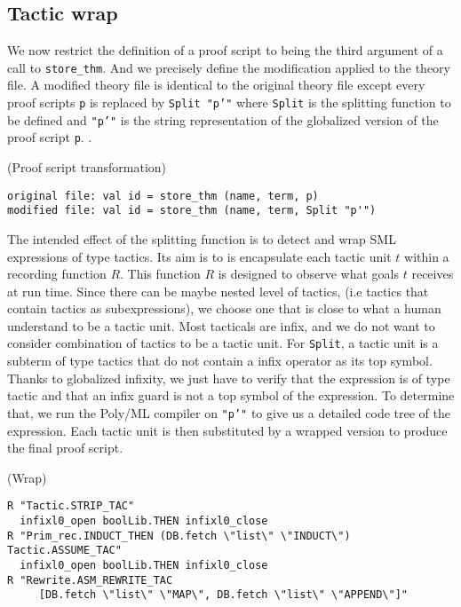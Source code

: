 \documentclass[runningheads,a4paper,draft]{svjour3}
\def\sml{\textsf{SML}\xspace}
\def\polyml{\textsf{Poly/ML}\xspace}
\begin{document}
\subsection{Tactic wrap}

We now restrict the definition of a proof script to being the third 
argument of a call to \texttt{store\_thm}. And we precisely define the 
modification applied to the theory file. A modified theory file is identical to 
the original theory file except every proof scripts \texttt{p} is
replaced by \texttt{Split "p'"} where \texttt{Split} is the splitting function 
to be defined and \texttt{"p'"} is the string representation of the globalized 
version of the proof script 
\texttt{p}. 
.
\begin{example}(Proof script transformation)
\begin{lstlisting}[language=SMLSmall,frame=tb]
original file: val id = store_thm (name, term, p)
modified file: val id = store_thm (name, term, Split "p'")
\end{lstlisting}
\end{example}


The intended effect of the splitting function is to detect and wrap \sml 
expressions of type tactics. Its aim is to is encapsulate each tactic 
unit $t$ within a recording function $R$. This function $R$ is designed to 
observe what goals $t$ receives at run time. Since there can be maybe nested 
level of tactics, (i.e 
tactics that contain tactics as subexpressions), we choose one that is
close to what a human understand to be a tactic unit. 
Most tacticals are infix, and we do not want to consider combination of 
tactics to be a tactic unit. For \texttt{Split}, a tactic unit is a 
subterm of 
type tactics that do not contain a infix operator as its top symbol. Thanks to
globalized infixity, we just have to verify that the expression 
is of type tactic and that an infix guard is not a top symbol of the expression.
To determine that, we run the \polyml compiler on \texttt{"p'"} to give us a 
detailed code tree of the expression. Each tactic unit is then substituted 
by a wrapped version to produce the final proof script.

\begin{example} (Wrap)
\begin{lstlisting}[language=SMLSmall,frame=tb]
R "Tactic.STRIP_TAC"
  infixl0_open boolLib.THEN infixl0_close
R "Prim_rec.INDUCT_THEN (DB.fetch \"list\" \"INDUCT\") Tactic.ASSUME_TAC"
  infixl0_open boolLib.THEN infixl0_close
R "Rewrite.ASM_REWRITE_TAC 
     [DB.fetch \"list\" \"MAP\", DB.fetch \"list\" \"APPEND\"]"
\end{lstlisting}
\end{example}   
\end{document}
